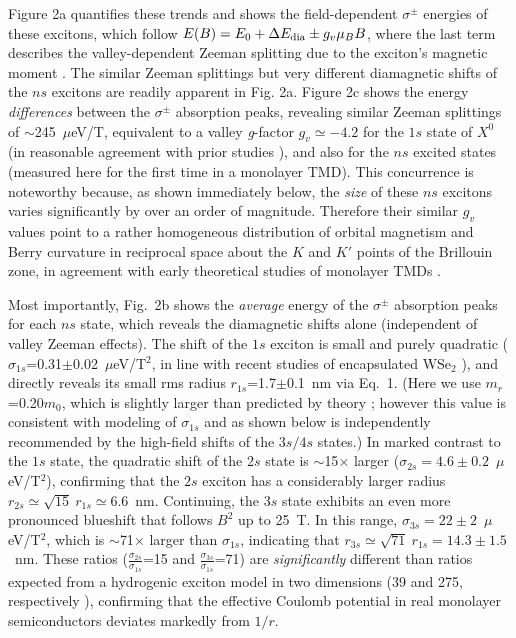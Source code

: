 \documentclass[aps,prl,twocolumn]{revtex4-1}
\begin{document}
Figure 2a quantifies these trends and shows the field-dependent $\sigma^\pm$ energies of these excitons, which follow $E(B) = E_0 + \Delta E_{\rm dia} \pm g_v \mu_B B$, where the last term describes the valley-dependent Zeeman splitting due to the exciton's magnetic moment \cite{Stier_NatComm}. The similar Zeeman splittings but very different diamagnetic shifts of the $ns$ excitons are readily apparent in Fig. 2a. Figure 2c shows the energy \textit{differences} between the $\sigma^\pm$ absorption peaks, revealing similar Zeeman splittings of $\sim$245~$\mu$eV/T, equivalent to a valley \textit{g}-factor $g_v \simeq -4.2$ for the $1s$ state of $X^0$ (in reasonable agreement with prior studies \cite{Srivastava, Wang, Stier_Nano, Mitioglu}), and also for the $ns$ excited states (measured here for the first time in a monolayer TMD). This concurrence is noteworthy because, as shown immediately below, the \textit{size} of these $ns$ excitons varies significantly by over an order of magnitude. Therefore their similar $g_v$ values point to a rather homogeneous distribution of orbital magnetism and Berry curvature in reciprocal space about the $K$ and $K'$ points of the Brillouin zone, in agreement with early theoretical studies of monolayer TMDs \cite{Cao}.

Most importantly, Fig.~2b shows the \textit{average} energy of the $\sigma^\pm$ absorption peaks for each $ns$ state, which reveals the diamagnetic shifts alone (independent of valley Zeeman effects).  The shift of the $1s$ exciton is small and purely quadratic ($\sigma_{1s}$=0.31$\pm$0.02~$\mu$eV/T$^2$, in line with recent studies of encapsulated WSe$_2$ \cite{Stier_Nano}), and directly reveals its small rms radius $r_{1s}$=1.7$\pm$0.1~nm via Eq.~1.  (Here we use $m_r$=0.20$m_0$, which is slightly larger than predicted by theory \cite{Kyla, Berkelbach}; however this value is consistent with modeling of $\sigma_{1s}$ \cite{SM} and as shown below is independently recommended by the high-field shifts of the $3s/4s$ states.)  In marked contrast to the $1s$ state, the quadratic shift of the $2s$ state is $\sim$15$\times$ larger ($\sigma_{2s} = 4.6 \pm 0.2$~$\mu$eV/T$^2$), confirming that the $2s$ exciton has a considerably larger radius $r_{2s} \simeq \sqrt{15}~r_{1s} \simeq$6.6~nm. Continuing, the $3s$ state exhibits an even more pronounced blueshift that follows $B^2$ up to 25~T. In this range, $\sigma_{3s} = 22 \pm 2$~$\mu$eV/T$^2$, which is $\sim$71$\times$ larger than $\sigma_{1s}$, indicating that $r_{3s} \simeq \sqrt{71}~r_{1s} = 14.3 \pm 1.5$~nm. These ratios ($\frac{\sigma_{2s}}{\sigma_{1s}}$=15 and $\frac{\sigma_{3s}}{\sigma_{1s}}$=71) are \textit{significantly} different than ratios expected from a hydrogenic exciton model in two dimensions (39 and 275, respectively \cite{Ritchie}), confirming that the effective Coulomb potential in real monolayer semiconductors deviates markedly from $1/r$.
\end{document}
